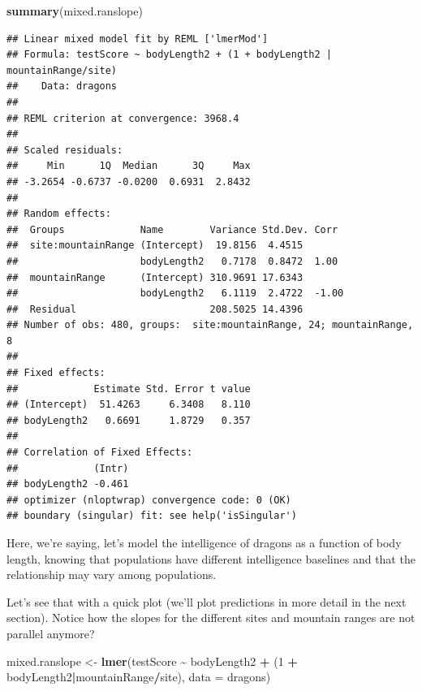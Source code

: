 \documentclass[
]{article}
\newenvironment{Shaded}{\begin{snugshade}}{\end{snugshade}}
\newcommand{\AttributeTok}[1]{\textcolor[rgb]{0.13,0.29,0.53}{#1}}
\newcommand{\DecValTok}[1]{\textcolor[rgb]{0.00,0.00,0.81}{#1}}
\newcommand{\FunctionTok}[1]{\textcolor[rgb]{0.13,0.29,0.53}{\textbf{#1}}}
\newcommand{\NormalTok}[1]{#1}
\newcommand{\OtherTok}[1]{\textcolor[rgb]{0.56,0.35,0.01}{#1}}
\newcommand{\SpecialCharTok}[1]{\textcolor[rgb]{0.81,0.36,0.00}{\textbf{#1}}}
\begin{document}
\begin{Shaded}
\begin{Highlighting}[]
\FunctionTok{summary}\NormalTok{(mixed.ranslope)}
\end{Highlighting}
\end{Shaded}

\begin{verbatim}
## Linear mixed model fit by REML ['lmerMod']
## Formula: testScore ~ bodyLength2 + (1 + bodyLength2 | mountainRange/site)
##    Data: dragons
## 
## REML criterion at convergence: 3968.4
## 
## Scaled residuals: 
##     Min      1Q  Median      3Q     Max 
## -3.2654 -0.6737 -0.0200  0.6931  2.8432 
## 
## Random effects:
##  Groups             Name        Variance Std.Dev. Corr 
##  site:mountainRange (Intercept)  19.8156  4.4515       
##                     bodyLength2   0.7178  0.8472  1.00 
##  mountainRange      (Intercept) 310.9691 17.6343       
##                     bodyLength2   6.1119  2.4722  -1.00
##  Residual                       208.5025 14.4396       
## Number of obs: 480, groups:  site:mountainRange, 24; mountainRange, 8
## 
## Fixed effects:
##             Estimate Std. Error t value
## (Intercept)  51.4263     6.3408   8.110
## bodyLength2   0.6691     1.8729   0.357
## 
## Correlation of Fixed Effects:
##             (Intr)
## bodyLength2 -0.461
## optimizer (nloptwrap) convergence code: 0 (OK)
## boundary (singular) fit: see help('isSingular')
\end{verbatim}

Here, we're saying, let's model the intelligence of dragons as a
function of body length, knowing that populations have different
intelligence baselines and that the relationship may vary among
populations.

Let's see that with a quick plot (we'll plot predictions in more detail
in the next section). Notice how the slopes for the different sites and
mountain ranges are not parallel anymore?

\begin{Shaded}
\begin{Highlighting}[]
\NormalTok{mixed.ranslope }\OtherTok{\textless{}{-}} \FunctionTok{lmer}\NormalTok{(testScore }\SpecialCharTok{\textasciitilde{}}\NormalTok{ bodyLength2 }\SpecialCharTok{+}\NormalTok{ (}\DecValTok{1} \SpecialCharTok{+}\NormalTok{ bodyLength2}\SpecialCharTok{|}\NormalTok{mountainRange}\SpecialCharTok{/}\NormalTok{site), }\AttributeTok{data =}\NormalTok{ dragons)}
\end{Highlighting}
\end{Shaded}
\end{document}
